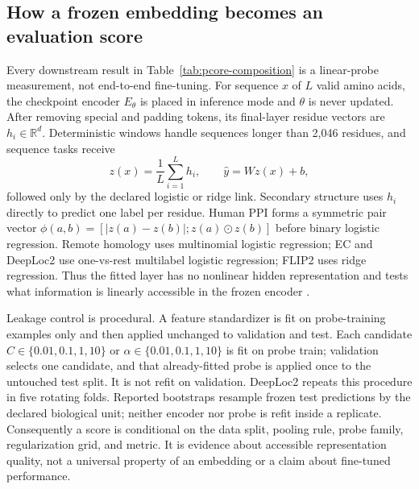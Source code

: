 \documentclass{article}
\begin{document}
\subsection{How a frozen embedding becomes an evaluation score}

Every downstream result in Table~\ref{tab:pcore-composition} is a linear-probe
measurement, not end-to-end fine-tuning. For sequence $x$ of $L$ valid amino
acids, the checkpoint encoder $E_\theta$ is placed in inference mode and
$\theta$ is never updated. After removing special and padding tokens, its
final-layer residue vectors are $h_i\in\mathbb{R}^d$. Deterministic windows
handle sequences longer than 2,046 residues, and sequence tasks receive
\[
  z(x)=\frac{1}{L}\sum_{i=1}^{L}h_i,
  \qquad \widehat{y}=Wz(x)+b,
\]
followed only by the declared logistic or ridge link. Secondary structure uses
$h_i$ directly to predict one label per residue. Human PPI forms a symmetric
pair vector
$\phi(a,b)=[\lvert z(a)-z(b)\rvert;z(a)\odot z(b)]$ before binary logistic
regression. Remote homology uses multinomial logistic regression; EC and
DeepLoc2 use one-vs-rest multilabel logistic regression; FLIP2 uses ridge
regression. Thus the fitted layer has no nonlinear hidden representation and
tests what information is linearly accessible in the frozen encoder
\citep{rao2019tape,xu2022peer}.

Leakage control is procedural. A feature standardizer is fit on probe-training
examples only and then applied unchanged to validation and test. Each candidate
$C\in\{0.01,0.1,1,10\}$ or
$\alpha\in\{0.01,0.1,1,10\}$ is fit on probe train; validation selects one
candidate, and that already-fitted probe is applied once to the untouched test
split. It is not refit on validation. DeepLoc2 repeats this procedure in five
rotating folds. Reported bootstraps resample frozen test predictions by the
declared biological unit; neither encoder nor probe is refit inside a replicate.
Consequently a score is conditional on the data split, pooling rule, probe
family, regularization grid, and metric. It is evidence about accessible
representation quality, not a universal property of an embedding or a claim
about fine-tuned performance.
\end{document}
